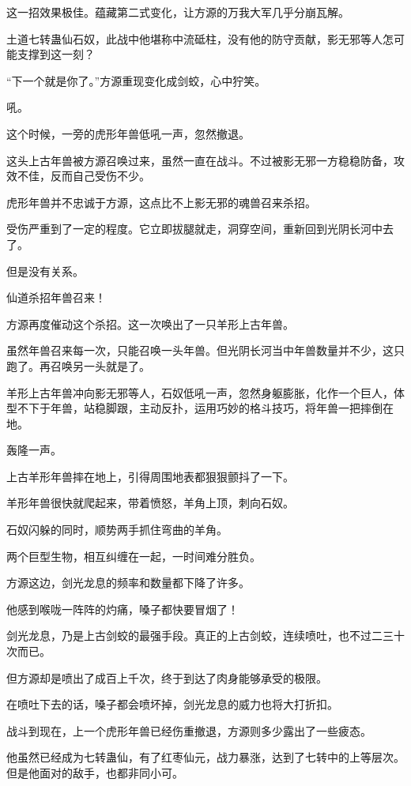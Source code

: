 \begin{this_body}
这一招效果极佳。蕴藏第二式变化，让方源的万我大军几乎分崩瓦解。

土道七转蛊仙石奴，此战中他堪称中流砥柱，没有他的防守贡献，影无邪等人怎可能支撑到这一刻？

“下一个就是你了。”方源重现变化成剑蛟，心中狞笑。

吼。

这个时候，一旁的虎形年兽低吼一声，忽然撤退。

这头上古年兽被方源召唤过来，虽然一直在战斗。不过被影无邪一方稳稳防备，攻效不佳，反而自己受伤不少。

虎形年兽并不忠诚于方源，这点比不上影无邪的魂兽召来杀招。

受伤严重到了一定的程度。它立即拔腿就走，洞穿空间，重新回到光阴长河中去了。

但是没有关系。

仙道杀招年兽召来！

方源再度催动这个杀招。这一次唤出了一只羊形上古年兽。

虽然年兽召来每一次，只能召唤一头年兽。但光阴长河当中年兽数量并不少，这只跑了。再召唤另一头就是了。

羊形上古年兽冲向影无邪等人，石奴低吼一声，忽然身躯膨胀，化作一个巨人，体型不下于年兽，站稳脚跟，主动反扑，运用巧妙的格斗技巧，将年兽一把摔倒在地。

轰隆一声。

上古羊形年兽摔在地上，引得周围地表都狠狠颤抖了一下。

羊形年兽很快就爬起来，带着愤怒，羊角上顶，刺向石奴。

石奴闪躲的同时，顺势两手抓住弯曲的羊角。

两个巨型生物，相互纠缠在一起，一时间难分胜负。

方源这边，剑光龙息的频率和数量都下降了许多。

他感到喉咙一阵阵的灼痛，嗓子都快要冒烟了！

剑光龙息，乃是上古剑蛟的最强手段。真正的上古剑蛟，连续喷吐，也不过二三十次而已。

但方源却是喷出了成百上千次，终于到达了肉身能够承受的极限。

在喷吐下去的话，嗓子都会喷坏掉，剑光龙息的威力也将大打折扣。

战斗到现在，上一个虎形年兽已经伤重撤退，方源则多少露出了一些疲态。

他虽然已经成为七转蛊仙，有了红枣仙元，战力暴涨，达到了七转中的上等层次。但是他面对的敌手，也都非同小可。


\end{this_body}
